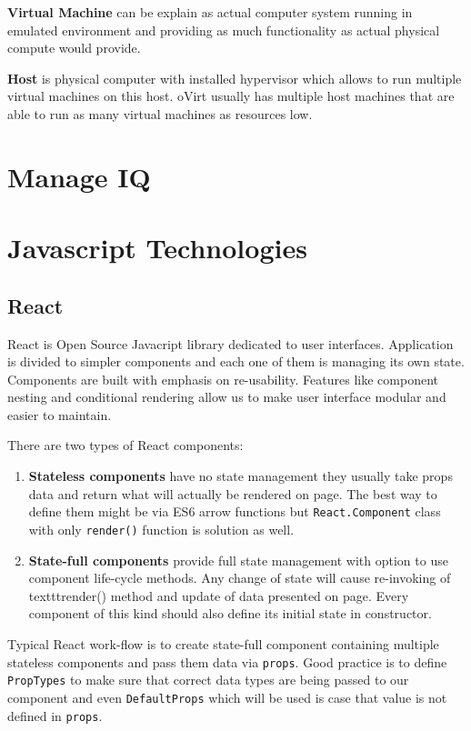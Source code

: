 \textbf{Virtual Machine} can be explain as actual computer system running in emulated environment and providing as much functionality as actual physical compute would provide.

\textbf{Host} is physical computer with installed hypervisor which allows to run multiple virtual machines on this host. oVirt usually has multiple host machines that are able to run as many virtual machines as resources low.

\chapter{Manage IQ}

\chapter{Javascript Technologies}

\section{React}
React is Open Source Javacript library dedicated to user interfaces. Application is divided to simpler components and each one of them is managing its own state. Components are built with emphasis on re-usability. Features like component nesting and conditional rendering allow us to make user interface modular and easier to maintain.

There are two types of React components:
\begin{enumerate}
\item \textbf{Stateless components} have no state management they usually take props data and return what will actually be rendered on page. The best way to define them might be via ES6 arrow functions but \texttt{React.Component} class with only \texttt{render()} function is solution as well.

\item \textbf{State-full components} provide full state management with option to use component life-cycle methods. Any change of state will cause re-invoking of texttt{render()} method and update of data presented on page. Every component of this kind should also define its initial state in constructor.
\end{enumerate}

Typical React work-flow is to create state-full component containing multiple stateless components and pass them data via \texttt{props}. Good practice is to define \texttt{PropTypes} to make sure that correct data types are being passed to our component and even \texttt{DefaultProps} which will be used is case that value is not defined in \texttt{props}. 

